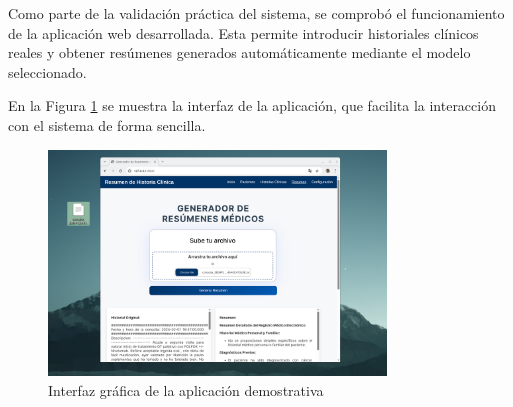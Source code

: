 \documentclass[../main.tex]{subfiles}
\begin{document}
Como parte de la validación práctica del sistema, se comprobó el funcionamiento de la aplicación web desarrollada. Esta permite introducir historiales clínicos reales y obtener resúmenes generados automáticamente mediante el modelo seleccionado.

En la Figura \ref{fig:demo_app} se muestra la interfaz de la aplicación, que facilita la interacción con el sistema de forma sencilla. 

\begin{figure}[H]
	\centering
	\includegraphics[width=0.8\textwidth]{images/app.png}
	\caption{Interfaz gráfica de la aplicación demostrativa}
	\label{fig:demo_app}
\end{figure}
\end{document}
